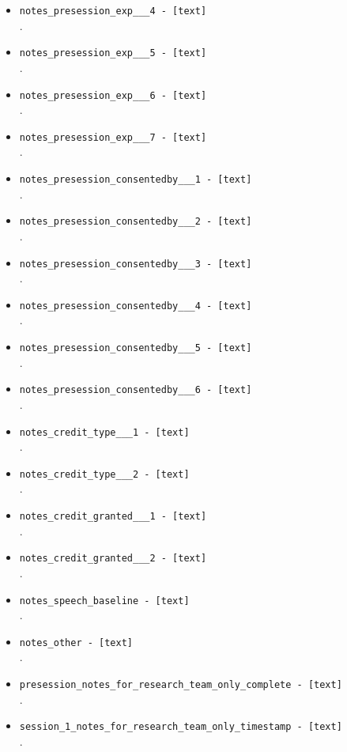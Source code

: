 \begin{description}
\begin{addmargin}[0em]{0em}
\begin{addmargin}[1em]{0em}
\begin{itemize}
            \item \verb|notes_presession_exp___4 - [text]|\\.
            \item \verb|notes_presession_exp___5 - [text]|\\.
            \item \verb|notes_presession_exp___6 - [text]|\\.
            \item \verb|notes_presession_exp___7 - [text]|\\.
            \item \verb|notes_presession_consentedby___1 - [text]|\\.
            \item \verb|notes_presession_consentedby___2 - [text]|\\.
            \item \verb|notes_presession_consentedby___3 - [text]|\\.
            \item \verb|notes_presession_consentedby___4 - [text]|\\.
            \item \verb|notes_presession_consentedby___5 - [text]|\\.
            \item \verb|notes_presession_consentedby___6 - [text]|\\.
            \item \verb|notes_credit_type___1 - [text]|\\.
            \item \verb|notes_credit_type___2 - [text]|\\.
            \item \verb|notes_credit_granted___1 - [text]|\\.
            \item \verb|notes_credit_granted___2 - [text]|\\.
            \item \verb|notes_speech_baseline - [text]|\\.
            \item \verb|notes_other - [text]|\\.
            \item \verb|presession_notes_for_research_team_only_complete - [text]|\\.
            \item \verb|session_1_notes_for_research_team_only_timestamp - [text]|\\.

\end{itemize}
\end{addmargin}
\end{addmargin}
\end{description}
